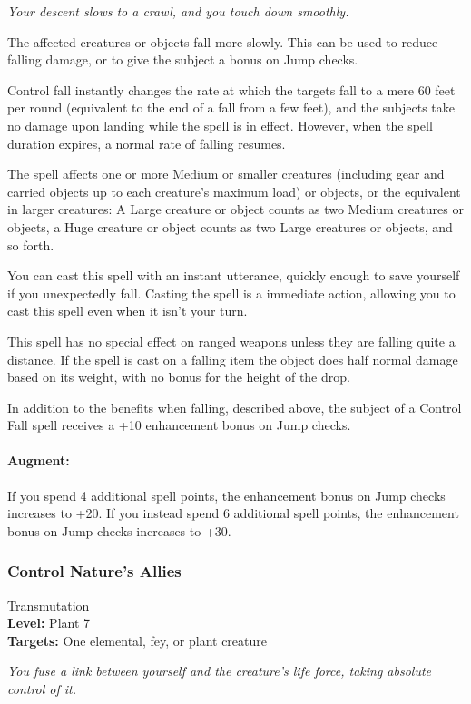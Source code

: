 \emph{Your descent slows to a crawl, and you touch down smoothly.}

The affected creatures or objects fall more slowly. This can be used to reduce falling damage, or to give the subject a bonus on Jump checks. 

Control fall instantly changes the rate at which the targets fall to a mere 60 feet per round (equivalent to the end of a fall from a few feet), 
and the subjects take no damage upon landing while the spell is in effect. However, when the spell duration expires, a normal rate of falling resumes.

The spell affects one or more Medium or smaller creatures (including gear and carried objects up to each creature's maximum load) or objects, 
or the equivalent in larger creatures: 
A Large creature or object counts as two Medium creatures or objects, a Huge creature or object counts as two Large creatures or objects, and so forth.

You can cast this spell with an instant utterance, quickly enough to save yourself if you unexpectedly fall. 
Casting the spell is a immediate action, allowing you to cast this spell even when it isn't your turn.

This spell has no special effect on ranged weapons unless they are falling quite a distance. 
If the spell is cast on a falling item the object does half normal damage based on its weight, with no bonus for the height of the drop.

In addition to the benefits when falling, described above, the subject of a Control Fall spell receives a +10 enhancement bonus on Jump checks.

\paragraph{Augment:} If you spend 4 additional spell points, the enhancement bonus on Jump checks increases to +20.
If you instead spend 6 additional spell points, the enhancement bonus on Jump checks increases to +30.
\subsubsection{Control Nature's Allies}
\label{Spell:ControlNaturesAllies}
Transmutation
\\ \textbf{Level:} Plant 7
\\ \textbf{Targets:} One elemental, fey, or plant creature

\emph{You fuse a link between yourself and the creature's life force, taking absolute control of it.}

